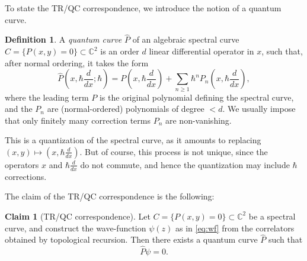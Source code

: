 \documentclass[reqno,oneside,11pt]{amsart}
\theoremstyle{plain}
\theoremstyle{definition}
\newtheorem{definition}[theorem]{Definition}
\newtheorem*{claim}{Claim}
\theoremstyle{remark}
\numberwithin{equation}{section}
\begin{document}
To state the TR/QC correspondence, we introduce the notion of a quantum curve.

\begin{definition}\label{d:QC}
A \emph{quantum curve} $\hat{P}$ of an algebraic spectral curve $C = \{P(x,y) = 0\} \subset \mathbb{C}^2$ is an order $d$ linear differential operator in $x$, such that, after normal ordering, it takes the form
\begin{equation}
\hat{P}\left(  x, \hbar \frac{d}{dx}; \hbar \right) = P\left(  x,\hbar \frac{d}{dx}\right) + \sum_{n \geq 1} \hbar^n P_n\left(x,\hbar \frac{d}{dx}\right),
\end{equation}
where the leading term $P$ is the original polynomial defining the spectral curve, and the $P_n$ are (normal-ordered) polynomials of degree $< d$. We usually impose that only finitely many correction terms $P_n$ are non-vanishing.
\end{definition}

This is a quantization of the spectral curve, as it amounts to replacing $(x,y) \mapsto \left( x, \hbar \frac{d}{dx} \right)$. But of course, this process is not unique, since the operators $x$ and $\hbar \frac{d}{dx}$ do not commute, and hence the quantization may include $\hbar$ corrections.

The claim of the TR/QC correspondence is the following:

\begin{claim}[TR/QC correspondence]
Let $C = \{P(x,y) = 0\} \subset \mathbb{C}^2$ be a spectral curve, and construct the wave-function $\psi(z)$ as in \eqref{eq:wf} from the correlators obtained by topological recursion. Then there exists a quantum curve $\hat{P}$ such that
\begin{equation}
\hat{P} \psi = 0.
\end{equation}
\end{claim}
\end{document}
